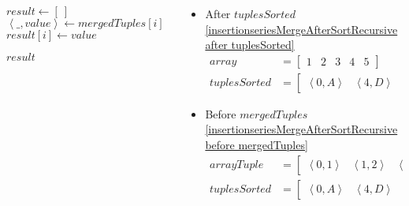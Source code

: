 \begin{frame}[containsverbatim]{\insertionseriesexampleframe}
\begin{columns}[c]
\begin{column}{0.45\textwidth}
{\begin{minipage}[c]{\textwidth}
\begin{algorithm}[H]
\begin{algorithmic}[1]
                                            \State $result \gets \left[\ \right]$
                                                \State $\left<\_, value\right> \gets mergedTuples{\left[i\right]}$
                                                \State $result{\left[i\right]} \gets value$
                                            \EndFor
                                            \label{insertionseriesMergeAfterSortRecursive after result}
                        
                                            \State \Return $result$
                                        \EndFunction
                                    \end{algorithmic}
                                \end{algorithm}
                            \endgroup
                        \end{minipage}
                    }
                \end{column}

                \begin{column}{0.55\textwidth}
                    \scriptsize
                    \begin{itemize}
                        \item After $tuplesSorted$ \cref{insertionseriesMergeAfterSortRecursive after tuplesSorted}
                        \begin{align*}
                            array & = \begin{bmatrix}1 & 2 & 3 & 4 & 5\end{bmatrix} \\
                            tuplesSorted & = \begin{bmatrix}\left<0, A\right> & \left<4, D\right> & \left<6, F\right> & \left<8, I\right>\end{bmatrix}
                        \end{align*}

                        \item Before $mergedTuples$ \cref{insertionseriesMergeAfterSortRecursive before mergedTuples}
                        \begin{align*}
                            arrayTuple & = \begin{bmatrix}\left<0, 1\right> & \left<1, 2\right> & \left<2, 3\right> & \left<3, 4\right> & \left<4, 5\right>\end{bmatrix} \\
                            tuplesSorted & = \begin{bmatrix}\left<0, A\right> & \left<4, D\right> & \left<6, F\right> & \left<8, I\right>\end{bmatrix}
                        \end{align*}


\end{itemize}
\end{column}
\end{columns}
\end{frame}
